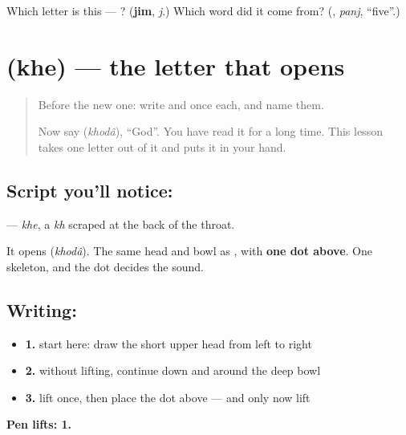 \begin{tcolorbox}[breakable,colback=teal!4,colframe=teal!35!black,title={Before you move on}]
Which letter is this — ? (\textbf{jim}, \emph{j}.) Which word did it come from? (\textbf{}, \emph{panj}, \textquotedblleft{}five\textquotedblright{}.)
\end{tcolorbox}
\section[\texorpdfstring{\fa{خ} (khe)}{خ (khe)}]{ (khe) — the letter that opens }

\label{lesson:FA-W23-khe}



\begin{quote}
Before the new one: write  and  once each, and name them.

Now say \textbf{} (\emph{khodâ}), \textquotedblleft{}God\textquotedblright{}. You have read it for a long time. This lesson takes one letter out of it and puts it in your hand.
\end{quote}

\subsection*{Script you'll notice: }
\textbf{} — \emph{khe}, a \emph{kh} scraped at the back of the throat.

It opens \textbf{} (\emph{khodâ}). The same head and bowl as \textbf{}, with \textbf{one dot above}. One skeleton, and the dot decides the sound.

\subsection*{Writing: }

\begin{itemize}
\raggedright
  \item \textbf{1.} start here: draw the short upper head from left to right
  \item \textbf{2.} without lifting, continue down and around the deep bowl
  \item \textbf{3.} lift once, then place the dot above — and only now lift
\end{itemize}

\textbf{Pen lifts: 1.}

